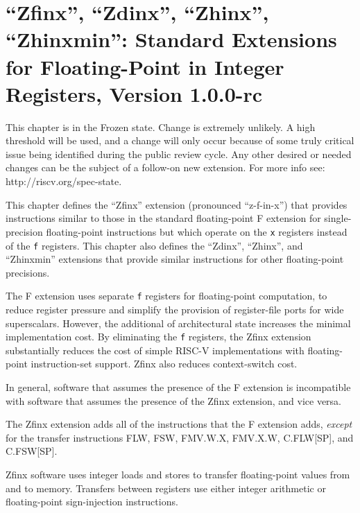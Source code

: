 \chapter{``Zfinx'', ``Zdinx'', ``Zhinx'', ``Zhinxmin'': Standard Extensions for Floating-Point in Integer Registers, Version 1.0.0-rc}
\label{sec:zfinx}

This chapter is in the Frozen state. Change is extremely unlikely. A high threshold will be used, 
and a change will only occur because of some truly critical issue being identified during the 
public review cycle. Any other desired or needed changes can be the subject of a follow-on 
new extension. For more info see: http://riscv.org/spec-state.

This chapter defines the ``Zfinx'' extension (pronounced ``z-f-in-x'')
that provides instructions similar to those in the standard
floating-point F extension for single-precision floating-point
instructions but which operate on the {\tt x} registers instead of the
{\tt f} registers.  This chapter also defines the ``Zdinx'',
``Zhinx'', and ``Zhinxmin'' extensions that provide similar
instructions for other floating-point precisions.

\begin{commentary}
The F extension uses separate {\tt f} registers for floating-point
computation, to reduce register pressure and simplify the provision of
register-file ports for wide superscalars.
However, the additional  of architectural state increases the
minimal implementation cost.
By eliminating the {\tt f} registers, the Zfinx extension substantially
reduces the cost of simple RISC-V implementations with floating-point
instruction-set support.
Zfinx also reduces context-switch cost.

In general, software that assumes the presence of the F extension
is incompatible with software that assumes the presence of the Zfinx
extension, and vice versa.
\end{commentary}

The Zfinx extension adds all of the instructions that the F extension
adds, {\em except} for the transfer instructions FLW, FSW, FMV.W.X,
FMV.X.W, C.FLW[SP], and C.FSW[SP].

\begin{commentary}
Zfinx software uses integer loads and stores to transfer floating-point values
from and to memory.
Transfers between registers use either integer arithmetic or floating-point
sign-injection instructions.
\end{commentary}

